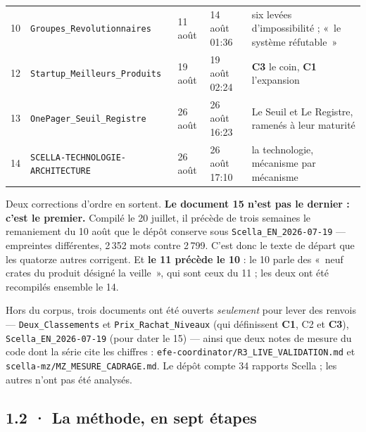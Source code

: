 \documentclass[10pt]{article}
\newcommand{\code}[1]{\texttt{\small #1}}
\newcommand{\ctrois}{\textcolor{c3col}{\textbf{C3}}}
\newcommand{\cun}{\textcolor{c1col}{\textbf{C1}}}
\begin{document}
{\begin{longtable}{@{}L{0.5cm}L{5.3cm}L{1.3cm}L{2.1cm}L{7.2cm}@{}}
10 & \code{Groupes\_Revolutionnaires} & 11 août & 14 août 01:36 & six levées d'impossibilité ; «~le système réfutable~» \\
12 & \code{Startup\_Meilleurs\_Produits} & 19 août & 19 août 02:24 & \ctrois{} le coin, \cun{} l'expansion \\
13 & \code{OnePager\_Seuil\_Registre} & 26 août & 26 août 16:23 & Le Seuil et Le Registre, ramenés à leur maturité \\
14 & \code{SCELLA-TECHNOLOGIE-ARCHITECTURE} & 26 août & 26 août 17:10 & la technologie, mécanisme par mécanisme \\
\bottomrule
\end{longtable}
}

Deux corrections d'ordre en sortent. \textbf{Le document 15 n'est pas le dernier : c'est le premier.} Compilé le
20 juillet, il précède de trois semaines le remaniement du 10 août que le dépôt conserve sous
\code{Scella\_EN\_2026-07-19} --- empreintes différentes, 2\,352 mots contre 2\,799. C'est donc le texte de départ que
les quatorze autres corrigent. Et \textbf{le 11 précède le 10} : le 10 parle des «~neuf crates du produit désigné la
veille~», qui sont ceux du 11 ; les deux ont été recompilés ensemble le 14.

Hors du corpus, trois documents ont été ouverts \emph{seulement} pour lever des renvois --- \code{Deux\_Classements}
et \code{Prix\_Rachat\_Niveaux} (qui définissent \cun{}, C2 et \ctrois{}), \code{Scella\_EN\_2026-07-19} (pour
dater le 15) --- ainsi que deux notes de mesure du code dont la série cite les chiffres :
\code{efe-coordinator/\allowbreak R3\_LIVE\_VALIDATION.md} et \code{scella-mz/\allowbreak MZ\_MESURE\_CADRAGE.md}. Le dépôt compte 34
rapports Scella ; les autres n'ont pas été analysés.

\subsection{1.2 · La méthode, en sept étapes}
\end{document}
